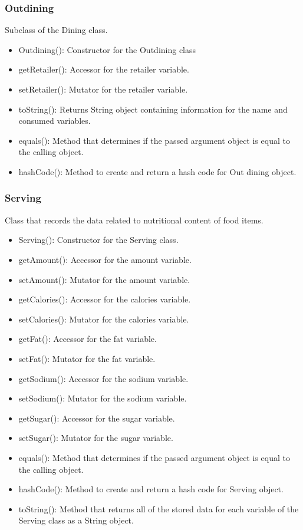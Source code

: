 \documentclass{scrreprt}
\begin{document}
\subsubsection{Outdining}
Subclass of the Dining class.

\begin{itemize}
\item Outdining(): Constructor for the Outdining class
\item getRetailer(): Accessor for the retailer variable.
\item setRetailer(): Mutator for the retailer variable.
 \item toString(): Returns String object containing information for the name and consumed variables.
 \item equals(): Method that determines if the passed argument object is equal to the calling object.
 \item hashCode(): Method to create and return a hash code for Out dining object.
\end{itemize}

\subsubsection{Serving}
Class that records the data related to nutritional content of food items.
\begin{itemize}
\item Serving(): Constructor for the Serving class.
\item getAmount(): Accessor for the amount variable.
\item setAmount(): Mutator for the amount variable.
\item getCalories(): Accessor for the calories variable.
\item setCalories(): Mutator for the calories variable.
\item getFat(): Accessor for the fat variable.
\item setFat(): Mutator for the fat variable.
\item getSodium(): Accessor for the sodium variable.
\item setSodium(): Mutator for the sodium variable.
\item getSugar(): Accessor for the sugar variable.
\item setSugar(): Mutator for the sugar variable.
 \item equals(): Method that determines if the passed argument object is equal to the calling object.
 \item hashCode(): Method to create and return a hash code for Serving object.
 \item toString(): Method that returns all of the stored data for each variable of the Serving class as a String object.
\end{itemize}
\end{document}
